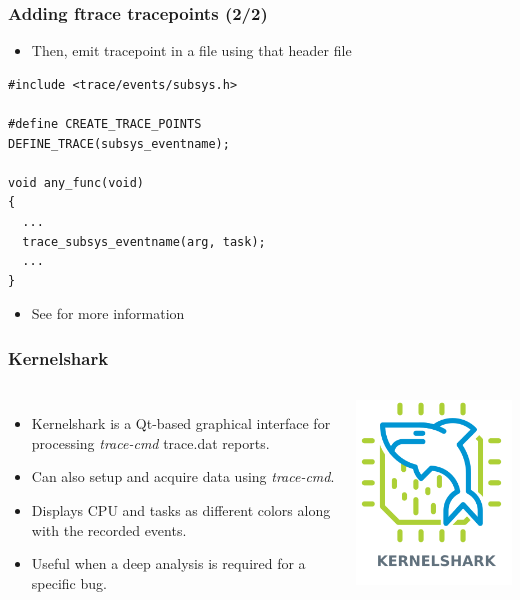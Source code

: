 \begin{frame}[fragile]
  \frametitle{Adding ftrace tracepoints (2/2)}
  \begin{itemize}
    \item Then, emit tracepoint in a  file using that header file
  \end{itemize}
  \begin{block}{}
    \begin{verbatim}
#include <trace/events/subsys.h>

#define CREATE_TRACE_POINTS
DEFINE_TRACE(subsys_eventname);

void any_func(void)
{
  ...
  trace_subsys_eventname(arg, task);
  ...
}
    \end{verbatim}
  \end{block}
  \begin{itemize}
    \item See  for more information
  \end{itemize}
\end{frame}

\begin{frame}[fragile]
  \frametitle{Kernelshark}
  \begin{columns}
    \begin{itemize}
      \item Kernelshark is a Qt-based graphical interface for processing
            {\em trace-cmd} trace.dat reports.
      \item Can also setup and acquire data using {\em trace-cmd}.
      \item Displays CPU and tasks as different colors along with the recorded
            events.
      \item Useful when a deep analysis is required for a specific bug.
    \end{itemize}
    \vspace{0.5cm}
    \center\includegraphics[height=0.6\textheight]{slides/debugging-system-wide-profiling/kernelshark-logo.png}
  \end{columns}
\end{frame}

